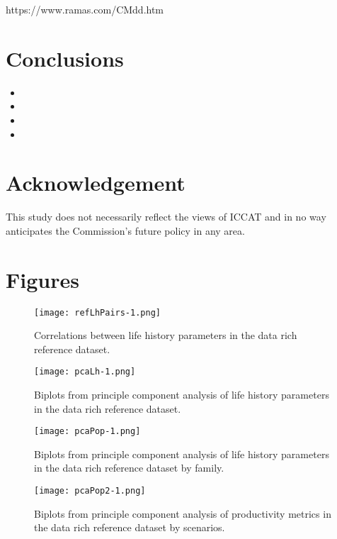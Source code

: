 \documentclass[12pt,doublespacing,a4paper]{ouparticle}
\begin{document}
https://www.ramas.com/CMdd.htm

\section{Conclusions}


\begin{itemize}
 \item 
 \item 
 \item 
 \item 
\end{itemize}

\section{Acknowledgement}

This study does not necessarily reflect the views of ICCAT and in no way anticipates the Commission's future policy in any area. 

\clearpage




\clearpage
\section{Figures}

\begin{figure}[htbp]
\centering
\texttt{[image: refLhPairs-1.png]}
\caption{Correlations between life history parameters in the data rich reference dataset.}
\label{fig:lhpar}
\end{figure}

\begin{figure}[htbp]
\centering
\texttt{[image: pcaLh-1.png]}
\caption{Biplots from principle component analysis of life history parameters in the data rich reference dataset.}
\label{fig:pcalh}
\end{figure}

\begin{figure}[htbp]
\centering
\texttt{[image: pcaPop-1.png]}
\caption{Biplots from principle component analysis of life history parameters in the data rich reference dataset by family.}
\label{fig:pcaRef}
\end{figure}


\begin{figure}[htbp]
\centering
\texttt{[image: pcaPop2-1.png]}
\caption{Biplots from principle component analysis of productivity metrics in the data rich reference dataset by scenarios.}
\label{fig:pcaRefScen}
\end{figure}
\end{document}
